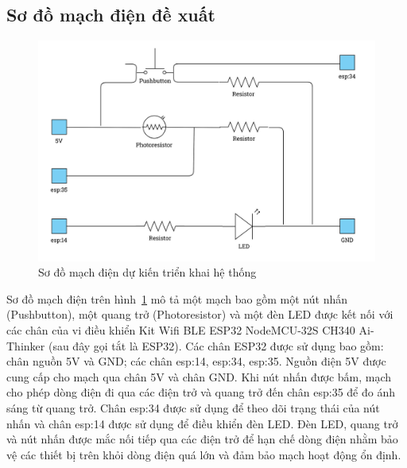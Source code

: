 {\subsection{Sơ đồ mạch điện đề xuất}
\begin{figure}[H]
    \centering
    \includegraphics[width=\textwidth]{img/Circuit.jpg}
    \caption{Sơ đồ mạch điện dự kiến triển khai hệ thống}
    \label{fig:Circuit}
\end{figure}

Sơ đồ mạch điện trên hình~\ref{fig:Circuit} mô tả một mạch bao gồm một nút nhấn (Pushbutton), một quang trở (Photoresistor) và một đèn LED được kết nối với các chân của vi điều khiển Kit Wifi BLE ESP32 NodeMCU-32S CH340 Ai-Thinker (sau đây gọi tắt là ESP32). Các chân ESP32 được sử dụng bao gồm: chân nguồn 5V và GND; các chân esp:14, esp:34, esp:35. Nguồn điện 5V được cung cấp cho mạch qua chân 5V và chân GND. Khi nút nhấn được bấm, mạch cho phép dòng điện đi qua các điện trở và quang trở đến chân esp:35 để đo ánh sáng từ quang trở. Chân esp:34 được sử dụng để theo dõi trạng thái của nút nhấn và chân esp:14 được sử dụng để điều khiển đèn LED. Đèn LED, quang trở và nút nhấn được mắc nối tiếp qua các điện trở để hạn chế dòng điện nhằm bảo vệ các thiết bị trên khỏi dòng điện quá lớn và đảm bảo mạch hoạt động ổn định.


}
